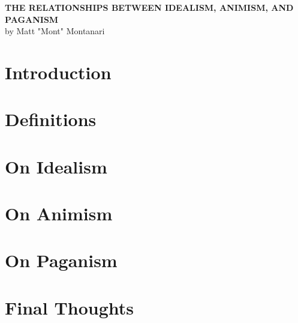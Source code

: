 \documentclass{report}
\begin{document}
\begin{titlepage}
    \vspace*{\fill}
    \begin{center}
        {\Large\uppercase{\textbf{The Relationships Between Idealism, Animism, and Paganism}}} \\
        \vspace{1cm}
        {\Large by Matt "Mont" Montanari} \\
    \end{center}
    \vspace*{\fill}
\end{titlepage}
\tableofcontents
\raggedright
\setlength{\parindent}{15pt}
\chapter{Introduction}

\chapter{Definitions}

\chapter{On Idealism}

\chapter{On Animism}

\chapter{On Paganism}

\chapter{Final Thoughts}

\printbibliography[heading=bibintoc]
\end{document}
